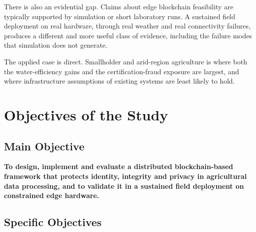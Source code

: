 There is also an evidential gap. Claims about edge blockchain feasibility are
typically supported by simulation or short laboratory runs. A
sustained field deployment on real hardware, through real weather and real
connectivity failures, produces a different and more useful class of evidence,
including the failure modes that simulation does not generate.

The applied case is direct. Smallholder and arid-region agriculture is where
both the water-efficiency gains and the certification-fraud exposure are
largest, and where infrastructure assumptions of existing systems are least
likely to hold.

\section{Objectives of the Study}
\label{sec:objectives}

\subsection{Main Objective}
\label{subsec:main_objective}

\textbf{To design, implement and evaluate a distributed blockchain-based
framework that protects identity, integrity and privacy in agricultural data
processing, and to validate it in a sustained field deployment on constrained
edge hardware.}

\subsection{Specific Objectives}
\label{subsec:specific_objectives}

